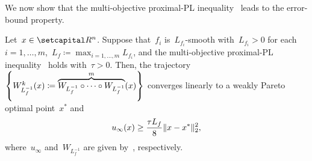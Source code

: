 \documentclass[../main]{subfiles}
\begin{document}
We now show that the multi-objective proximal-PL inequality~ leads to the error-bound property.
\begin{theorem} 
    Let~$x \in \setR^n$.
    Suppose that~$f_i$ is~$L_{f_i}$-smooth with~$L_{f_i} > 0$ for each~$i = 1, \dots, m$,~$L_f \coloneqq \max_{i = 1, \dots, m} L_{f_i}$, and the multi-objective proximal-PL inequality~ holds with~$\tau > 0$.
    Then, the trajectory~$\set*{W_{L_f^{-1}}^k(x) \coloneqq \overbrace{W_{L_f^{-1}} \circ \dots \circ W_{L_f^{-1}}}^{m}(x)}$ converges linearly to a weakly Pareto optimal point~$x^*$ and
    \begin{equation}
        u_\infty(x) \ge \frac{\tau L_f}{8} \norm{x - x^*}_2^2
        ,\end{equation}
    where~$u_\infty$ and~$W_{L_f^{-1}}$ are given by~, respectively.
\end{theorem}
\end{document}
